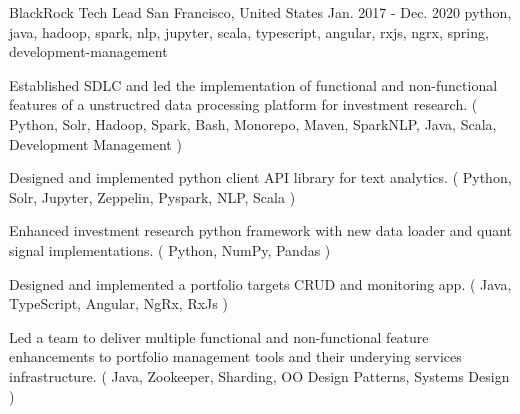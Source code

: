 \cventry
    {BlackRock} %
    {Tech Lead} %
    {San Francisco, United States} %
    {Jan. 2017 - Dec. 2020} %
    { python, java, hadoop, spark, nlp, jupyter, scala, typescript, angular, rxjs, ngrx, spring, development-management} %
    {
    \begin{cvitems} %
        \item { Established SDLC and led the implementation of functional and non-functional features of a unstructred data processing platform for investment research. ( Python, Solr, Hadoop, Spark, Bash, Monorepo, Maven, SparkNLP, Java, Scala, Development Management ) }
        \item { Designed and implemented python client API library for text analytics. ( Python, Solr, Jupyter, Zeppelin, Pyspark, NLP, Scala )}
        \item { Enhanced investment research python framework with new data loader and quant signal implementations. ( Python, NumPy, Pandas )}
        \item { Designed and implemented a portfolio targets CRUD and monitoring app. ( Java, TypeScript, Angular, NgRx, RxJs ) }
        \item { Led a team to deliver multiple functional and non-functional feature enhancements to portfolio management tools and their underying services infrastructure. ( Java, Zookeeper, Sharding, OO Design Patterns, Systems Design )}
    \end{cvitems}
    }





